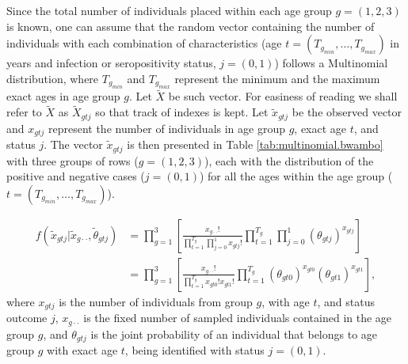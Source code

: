 Since the total number of individuals placed within each age group $g=(1,2,3)$ is known, one can assume that the random vector containing the number of
individuals with each combination of characteristics (age $t=(T_{g_{min}},\dots,T_{g_{max}})$ in years and infection or seropositivity status, $j=(0,1)$) follows a Multinomial distribution, where $T_{g_{min}}$ and $T_{g_{max}}$ represent the minimum and the maximum exact ages in age group $g$.
Let $\tilde{X}$ be such vector.
For easiness of reading we shall refer to $\tilde{X}$ as $\tilde{X}_{gtj}$ so that track of indexes is kept.
Let $\tilde{x}_{gtj}$ be the observed vector and $x_{gtj}$ represent the number of individuals in age group $g$, exact age $t$, and status $j$.
The vector $\tilde{x}_{gtj}$ is then presented in Table \ref{tab:multinomial.bwambo} with three groups of rows ($g=(1,2,3)$), each with the distribution of the positive and negative cases ($j=(0,1)$) for all the ages within the age group ($t=(T_{g_{min}},\dots,T_{g_{max}})$).

\begin{equation}
    \label{eq:multinomial.product}
    \begin{split}
    f(\tilde{x}_{gtj} | \tilde{x}_{g\cdot\cdot}, \tilde{\theta}_{gtj}) & = \prod_{g=1}^3 \left[ \frac{x_{g\cdot\cdot}!}{\prod_{t=1}^{T_g} \prod_{j=0}^1 x_{gtj}!} \prod_{t=1}^{T_g} \prod_{j=0}^1 (\theta_{gtj})^{x_{gtj}} \right] \\
    & = \prod_{g=1}^3 \left[\frac{x_{g\cdot\cdot}!}{\prod_{t=1}^{T_g} x_{gt0}!x_{gt1}!} \prod_{t=1}^{T_g} (\theta_{gt0})^{x_{gt0}} (\theta_{gt1})^{x_{gt1}} \right],
    \end{split}
\end{equation}
%
\noindent
where $x_{gtj}$ is the number of individuals from group $g$, with age $t$, and status outcome $j$, $x_{g\cdot\cdot}$ is the fixed number of sampled individuals contained in the age group $g$, and $\theta_{gtj}$ is the joint probability of an individual that belongs to age group $g$ with exact age $t$, being identified with status $j=(0,1)$.

